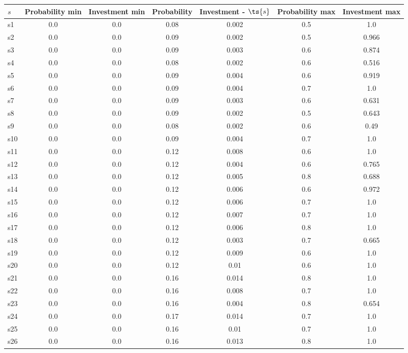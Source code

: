 \documentclass{article}
\begin{document}
\noindent\begin{tabular}{|l|c|c|c|c|c|c|}
\hline
$s$& Probability min & Investment min & Probability & Investment - $\ts{s}$ & Probability max & Investment max\\
\hline
s1 &0.0 & 0.0 & 0.08 & 0.002 & 0.5 & 1.0\\
\hline
s2 &0.0 & 0.0 & 0.09 & 0.002 & 0.5 & 0.966\\
\hline
s3 &0.0 & 0.0 & 0.09 & 0.003 & 0.6 & 0.874\\
\hline
s4 &0.0 & 0.0 & 0.08 & 0.002 & 0.6 & 0.516\\
\hline
s5 &0.0 & 0.0 & 0.09 & 0.004 & 0.6 & 0.919\\
\hline
s6 &0.0 & 0.0 & 0.09 & 0.004 & 0.7 & 1.0\\
\hline
s7 &0.0 & 0.0 & 0.09 & 0.003 & 0.6 & 0.631\\
\hline
s8 &0.0 & 0.0 & 0.09 & 0.002 & 0.5 & 0.643\\
\hline
s9 &0.0 & 0.0 & 0.08 & 0.002 & 0.6 & 0.49\\
\hline
s10 &0.0 & 0.0 & 0.09 & 0.004 & 0.7 & 1.0\\
\hline
s11 &0.0 & 0.0 & 0.12 & 0.008 & 0.6 & 1.0\\
\hline
s12 &0.0 & 0.0 & 0.12 & 0.004 & 0.6 & 0.765\\
\hline
s13 &0.0 & 0.0 & 0.12 & 0.005 & 0.8 & 0.688\\
\hline
s14 &0.0 & 0.0 & 0.12 & 0.006 & 0.6 & 0.972\\
\hline
s15 &0.0 & 0.0 & 0.12 & 0.006 & 0.7 & 1.0\\
\hline
s16 &0.0 & 0.0 & 0.12 & 0.007 & 0.7 & 1.0\\
\hline
s17 &0.0 & 0.0 & 0.12 & 0.006 & 0.8 & 1.0\\
\hline
s18 &0.0 & 0.0 & 0.12 & 0.003 & 0.7 & 0.665\\
\hline
s19 &0.0 & 0.0 & 0.12 & 0.009 & 0.6 & 1.0\\
\hline
s20 &0.0 & 0.0 & 0.12 & 0.01 & 0.6 & 1.0\\
\hline
s21 &0.0 & 0.0 & 0.16 & 0.014 & 0.8 & 1.0\\
\hline
s22 &0.0 & 0.0 & 0.16 & 0.008 & 0.7 & 1.0\\
\hline
s23 &0.0 & 0.0 & 0.16 & 0.004 & 0.8 & 0.654\\
\hline
s24 &0.0 & 0.0 & 0.17 & 0.014 & 0.7 & 1.0\\
\hline
s25 &0.0 & 0.0 & 0.16 & 0.01 & 0.7 & 1.0\\
\hline
s26 &0.0 & 0.0 & 0.16 & 0.013 & 0.8 & 1.0\\

\end{tabular}
\end{document}
